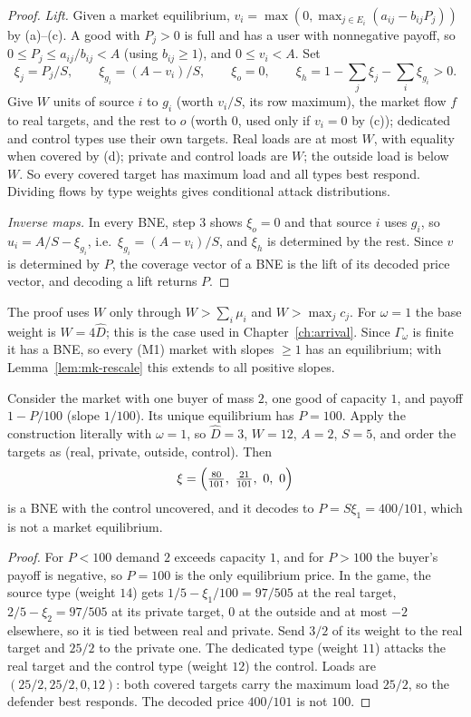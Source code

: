 \begin{proof}
\emph{Lift.} Given a market equilibrium, $v_i=\max(0,\max_{j\in E_i}(a_{ij}-b_{ij}P_j))$ by (a)--(c). A
good with $P_j>0$ is full and has a user with nonnegative payoff, so $0\le P_j\le a_{ij}/b_{ij}<A$ (using
$b_{ij}\ge1$), and $0\le v_i<A$. Set
\[
\xi_j=P_j/S,\qquad \xi_{g_i}=(A-v_i)/S,\qquad \xi_o=0,\qquad \xi_h=1-\sum_j\xi_j-\sum_i\xi_{g_i}>0 .
\]
Give $W$ units of source $i$ to $g_i$ (worth $v_i/S$, its row maximum), the market flow $f$ to real
targets, and the rest to $o$ (worth $0$, used only if $v_i=0$ by (c)); dedicated and control types use
their own targets. Real loads are at most $W$, with equality when covered by (d); private and control
loads are $W$; the outside load is below $W$. So every covered target has maximum load and all types
best respond. Dividing flows by type weights gives conditional attack distributions.

\emph{Inverse maps.} In every BNE, step 3 shows $\xi_o=0$ and that source $i$ uses $g_i$, so
$u_i=A/S-\xi_{g_i}$, i.e.\ $\xi_{g_i}=(A-v_i)/S$, and $\xi_h$ is determined by the rest. Since $v$ is
determined by $P$, the coverage vector of a BNE is the lift of its decoded price vector, and decoding a
lift returns $P$.
\end{proof}

The proof uses $W$ only through $W>\sum_i\mu_i$ and $W>\max_jc_j$. For $\omega=1$ the base weight is
$W=4\hat D$; this is the case used in Chapter~\ref{ch:arrival}. Since $\Gamma_\omega$ is finite it
has a BNE, so every (M1) market with slopes $\ge1$ has an equilibrium; with
Lemma~\ref{lem:mk-rescale} this extends to all positive slopes.

\begin{proposition}\label{prop:mk-below-one}
\statusrefereed
Consider the market with one buyer of mass $2$, one good of capacity $1$, and payoff $1-P/100$ (slope
$1/100$). Its unique equilibrium has $P=100$. Apply the construction literally with $\omega=1$, so
$\hat D=3$, $W=12$, $A=2$, $S=5$, and order the targets as (real, private, outside, control). Then
\[
\xi=\Bigl(\tfrac{80}{101},\ \tfrac{21}{101},\ 0,\ 0\Bigr)
\]
is a BNE with the control uncovered, and it decodes to $P=S\xi_1=400/101$, which is not a market
equilibrium.
\end{proposition}

\begin{proof}
For $P<100$ demand $2$ exceeds capacity $1$, and for $P>100$ the buyer's payoff is negative, so
$P=100$ is the only equilibrium price. In the game, the source type (weight $14$) gets
$1/5-\xi_1/100=97/505$ at the real target, $2/5-\xi_2=97/505$ at its private target, $0$ at the outside
and at most $-2$ elsewhere, so it is tied between real and private. Send $3/2$ of its
weight to the real target and $25/2$ to the private one. The dedicated type (weight $11$) attacks the
real target and the control type (weight $12$) the control. Loads are $(25/2,25/2,0,12)$: both covered
targets carry the maximum load $25/2$, so the defender best responds. The decoded price $400/101$ is not
$100$.
\end{proof}

